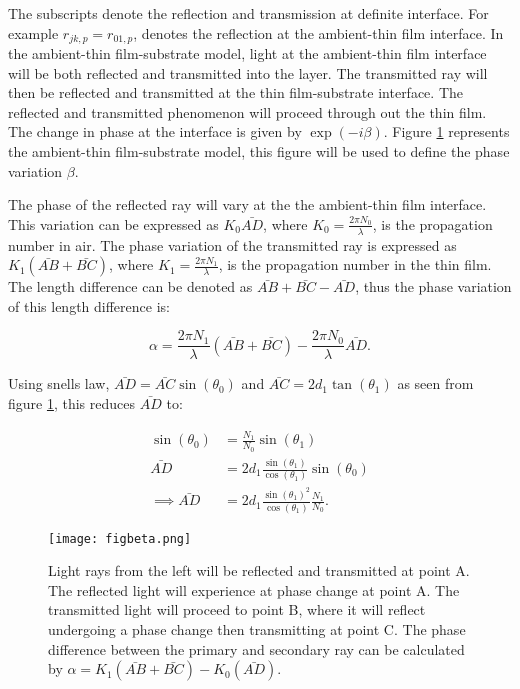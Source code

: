 \documentclass[MasterThesisMain.tex]{subfiles}
\begin{document}
The subscripts denote the reflection and transmission at definite interface. For example $r_{jk,p} = r_{01,p}$, denotes the reflection at the ambient-thin film interface. In the ambient-thin film-substrate model, light at the ambient-thin film interface will be both reflected and transmitted into the layer. The transmitted ray will then be reflected and transmitted at the thin film-substrate interface. The reflected and transmitted phenomenon will proceed through out the thin film. The change in phase at the interface is given by $\exp(-i\beta)$. Figure \ref{fig:beta} represents the ambient-thin film-substrate model, this figure will be used to define the phase variation $\beta$.

The phase of the reflected ray will vary at the the ambient-thin film interface. This variation can be expressed as $K_0\bar{AD}$, where $K_0=\frac{2\pi N_0}{\lambda}$, is the propagation number in air. The phase variation of the transmitted ray is expressed as $K_1(\bar{AB} + \bar{BC})$, where $K_1=\frac{2\pi N_1}{\lambda}$, is the propagation number in the thin film. The length difference can be denoted as $\bar{AB} + \bar{BC} - \bar{AD}$, thus the phase variation of this length difference is:

\begin{equation}\label{eq:phasealpha}
\alpha = \frac{2\pi N_1}{\lambda}(\bar{AB} + \bar{BC}) - \frac{2\pi N_0}{\lambda}\bar{AD}.
\end{equation}

Using snells law, $\bar{AD}=\bar{AC}\sin(\theta_0)$ and $\bar{AC}=2d_1\tan(\theta_1)$ as seen from figure \ref{fig:beta}, this reduces $\bar{AD}$ to:


\begin{align}
\sin(\theta_0) &= \frac{N_1}{N_0}\sin(\theta_1)\\
\bar{AD}&= 2d_1\frac{\sin(\theta_1)}{\cos(\theta_1)}\sin(\theta_0)\\
\implies \bar{AD}&= 2d_1\frac{\sin(\theta_1)^2}{\cos(\theta_1)}\frac{N_1}{N_0}.
\end{align}


\begin{figure}
\centering
\texttt{[image: figbeta.png]}
\caption{Light rays from the left will be reflected and transmitted at point A. The reflected light will experience at phase change at point A. The transmitted light will proceed to point B, where it will reflect undergoing a phase change then transmitting at point C. The phase difference between the primary and secondary ray can be calculated by $\alpha = K_1(\bar{AB}+\bar{BC})-K_0(\bar{AD})$.}
\label{fig:beta}
\end{figure}  
\end{document}
